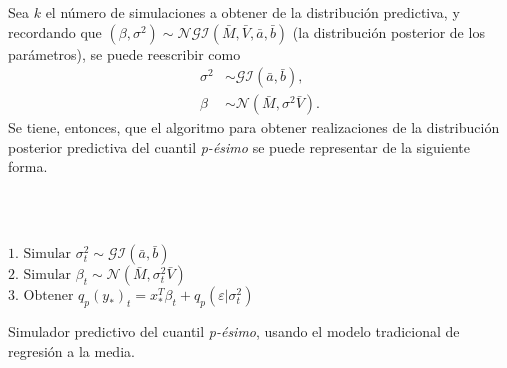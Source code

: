 Sea $k$ el n\'umero de simulaciones a obtener de la distribuci\'on predictiva, y recordando que $(\beta,\sigma^2) \sim \mathcal{NGI}(\bar{M},\bar{V},\bar{a},\bar{b})$ (la distribuci\'on posterior de los par\'ametros), se puede reescribir como
\begin{equation*}
\begin{aligned}
    \sigma^2 &\sim \mathcal{GI}(\bar{a},\bar{b}), \\
    \beta &\sim \mathcal{N}(\bar{M},\sigma^2 \bar{V}).
\end{aligned}
\end{equation*}
Se tiene, entonces, que el algoritmo para obtener realizaciones de la distribuci\'on posterior predictiva del cuantil \textit{p-\'esimo} se puede representar de la siguiente forma.


\\ \\
\begin{algorithm}[H]
 {
     {
        $1. \text{ Simular } \sigma^2_t \sim \mathcal{GI}(\bar{a},\bar{b})\;$\\
        $2. \text{ Simular } \beta_t \sim \mathcal{N}(\bar{M},\sigma^2_t \bar{V})\;$\\
        $3. \text{ Obtener } q_p(y_*)_t = x_*^T\beta_t + q_p(\varepsilon|\sigma^2_t) \;$
     }
 }
 \caption{Simulador predictivo del cuantil \textit{p-\'esimo}, usando el modelo tradicional de regresi\'on a la media.}
\end{algorithm}
\BlankLine

\newpage
